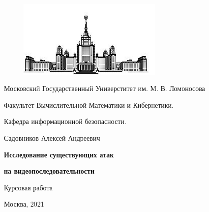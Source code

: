 \documentclass[12pt]{article}
\begin{document}
	\titlepage
	\begin{figure}
		\begin{center}
			\includegraphics[width=200pt]{msu.jpg}
		\end{center}
	\end{figure}
	
	\centerline{Московский Государственный Универститет им. М. В. Ломоносова}
	\centerline{Факультет Вычислительной Математики и Кибернетики.}
	\centerline{Кафедра информационной безопасности.}
	\vfill
	\Large
	\centerline{Садовников Алексей Андреевич}
	\vfill
	\normalsize
	\centerline{\bf \LARGE Исследование существующих атак}
	\centerline{\bf \LARGE на видеопоследовательности}
	\vfill
	\Large
	\centerline{Курсовая работа}
	\vfill
	\normalsize
	\vfill
	\centerline{Москва, 2021}
	\clearpage
	
	\tableofcontents 
	\newpage
	
\end{document}

